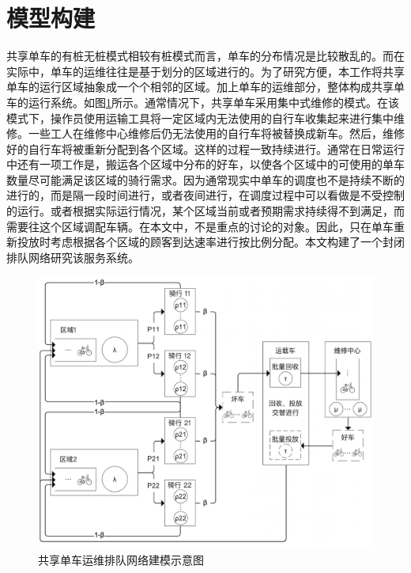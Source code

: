 \documentclass{article}
\begin{document}


\section{模型构建}
共享单车的有桩无桩模式相较有桩模式而言，单车的分布情况是比较散乱的。而在实际中，单车的运维往往是基于划分的区域进行的。为了研究方便，本工作将共享单车的运行区域抽象成一个个相邻的区域。加上单车的运维部分，整体构成共享单车的运行系统。如图\ref{fig:cenmodel}所示。通常情况下，共享单车采用集中式维修的模式。在该模式下，操作员使用运输工具将一定区域内无法使用的自行车收集起来进行集中维修。一些工人在维修中心维修后仍无法使用的自行车将被替换成新车。然后，维修好的自行车将被重新分配到各个区域。这样的过程一致持续进行。通常在日常运行中还有一项工作是，搬运各个区域中分布的好车，以使各个区域中的可使用的单车数量尽可能满足该区域的骑行需求。因为通常现实中单车的调度也不是持续不断的进行的，而是隔一段时间进行，或者夜间进行，在调度过程中可以看做是不受控制的运行。或者根据实际运行情况，某个区域当前或者预期需求持续得不到满足，而需要往这个区域调配车辆。在本文中，不是重点的讨论的对象。因此，只在单车重新投放时考虑根据各个区域的顾客到达速率进行按比例分配。本文构建了一个封闭排队网络研究该服务系统。

\begin{figure}[H]
    \centering
    \includegraphics[scale=0.3]{./model/model.png}
    \caption{共享单车运维排队网络建模示意图}
    \label{fig:cenmodel}
\end{figure}
\end{document}
